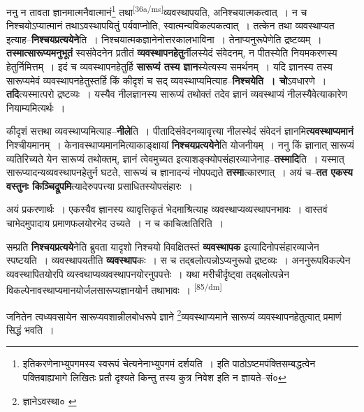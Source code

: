 \documentclass[article,12pt,a4paper]{memoir}
\begin{document}
	  \pstart ननु न तावता ज्ञानमात्मनैवात्मानं\footnote{इतिकरणेनाभ्युपगमस्य स्वरूपं चेत्यनेनाभ्युपगमं दर्शयति । इति पाठोऽष्टमपंक्तिसम्बद्धत्वेन पक्तिबाह्यभागे लिखितः प्रतौ दृश्यते किन्तु तस्य कुत्र निवेश इति न ज्ञायते--सं०} तथा\leavevmode\textsuperscript{\rmlatinfont\tiny [36a/ms]}व्यवस्थापयति, अनिश्चयात्मकत्वात् । न च निश्चयोऽप्यात्मानं तथाऽवस्थापयितुं पर्यवाप्नोति, स्वात्मन्यविकल्पकत्वात् । तत्केन तथा व्यवस्थाप्यत इत्याह--\textbf{निश्चयप्रत्ययेने}ति । निश्चयात्मकज्ञानेनोत्तरकालभाविना । तेनाप्यनुरूपेणेति द्रष्टव्यम् । \textbf{तस्मात्सारूप्यमनुभूतं} स्वसंवेदनेन प्रतीतं \textbf{व्यवस्थापनहेतु}र्नीलस्येदं संवेदनम्, न पीतस्येति नियमकरणस्य हेतुर्निमित्तम् । इदं च व्यवस्थापनहेतुर्हि \textbf{सारूप्यं तस्य ज्ञान}स्येत्यस्य समर्थनम् । यदि ज्ञानस्य तस्य सारूप्यमेवं व्यवस्थापनहेतुस्तर्हि किं कीदृशं च सद् व्यवस्थाप्यमित्याह--\textbf{निश्चयेति । चो}ऽवधारणे । \textbf{तदि}त्यस्मात्परो द्रष्टव्यः । यस्यैव नीलज्ञानस्य सारूप्यं तथोक्तं तदेव ज्ञानं व्यवस्थाप्यं नीलस्यैवेत्याकारेण नियाम्यमित्यर्थः ।
	\pend
      

	  \pstart कीदृशं सत्तथा व्यवस्थाप्यमित्याह--\textbf{नीले}ति । पीतादिसंवेदनव्यावृत्त्या नीलस्येदं संवेदनं ज्ञानमि\textbf{त्यवस्थाप्यमानं} निश्चीयमानम् । केनावस्थाप्यमानमित्याकाङ्क्षायां \textbf{निश्चयप्रत्ययेने}ति योजनीयम् । ननु किं ज्ञानात् सारूप्यं व्यतिरिच्यते येन सारूप्यं तथोक्तम्, ज्ञानं त्वेवमुच्यत इत्याशङ्क्योपसंहारव्याजेनाह--\textbf{तस्मादि}ति । यस्मात् सारूप्यादन्यव्यवस्थापनहेतुर्न घटते, सारूप्यं च ज्ञानादन्यं नोपपद्यते \textbf{तस्मा}त्कारणात् । अयं च--\textbf{तत एकस्य वस्तुनः किञ्चिद्रूपमि}त्यादेरुपपत्त्या प्रसाधितस्योपसंहारः ।
	\pend
      

	  \pstart अयं प्रकरणार्थः । एकस्यैव ज्ञानस्य व्यावृत्तिकृतं भेदमाश्रित्याह व्यवस्थाप्यव्यस्थापनभावः । वास्तवं चाभेदमुपादाय प्रमाणफलयोरभेद उच्यते । न च काचित्क्षतिरिति ।
	\pend
      

	  \pstart सम्प्रति \textbf{निश्चयप्रत्यये}नेति ब्रुवता यादृशो निश्चयो विवक्षितस्तं \textbf{व्यवस्थापक} इत्यादिनोपसंहारव्याजेन स्पष्टयति । व्यवस्थापयतीति \textbf{व्यवस्थाप}कः । स च तद्बलोत्पन्नोऽप्यनुरूपो द्रष्टव्यः । अननुरूपविकल्पेन व्यवस्थापितयोरपि व्यस्वथाप्यव्यवस्थापनयोरनुपपत्तेः । यथा मरीचीर्दृष्ट्वा तद्बलोत्पन्नेन विकल्पेनावस्थाप्यमानयोर्जलसारूप्यज्ञानयोर्न तथाभावः ।  \leavevmode\textsuperscript{\rmlatinfont\tiny [85/dm]} 
	  
	जनितेन त्वध्यवसायेन सारूप्यवशान्नीलबोधरूपे ज्ञाने \footnote{ज्ञानेऽवस्था० \cite{dp-msA} \cite{dp-edP} \cite{dp-edH} \cite{dp-edE} \cite{dp-edN}}व्यवस्थाप्यमाने सारूप्यं व्यवस्थापनहेतुत्वात् प्रमाणं सिद्धं भवति । 
	  
\end{document}
